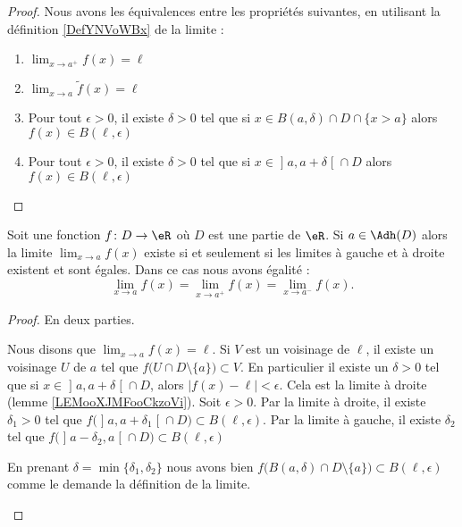 \begin{proof}
	Nous avons les équivalences entre les propriétés suivantes, en utilisant la définition \ref{DefYNVoWBx} de la limite :
	\begin{enumerate}
		\item
		      \( \lim_{x\to a^+} f(x)=\ell\)
		\item
		      \( \lim_{x\to a} \tilde f(x)=\ell\)
		\item
		      Pour tout \( \epsilon>0\), il existe \( \delta>0\) tel que si \( x\in B(a,\delta)\cap D\cap\{ x>a \}\) alors \( f(x)\in B(\ell,\epsilon)\)
		\item
		      Pour tout \( \epsilon>0\), il existe \( \delta>0\) tel que si \( x\in \mathopen] a , a+\delta \mathclose[\cap D\) alors \( f(x)\in B(\ell,\epsilon)\)
	\end{enumerate}
\end{proof}

\begin{proposition}      \label{PROPooGDDJooDCmydE}
	Soit une fonction \( f\colon D\to \eR\) où \( D\) est une partie de \( \eR\). Si \( a\in \Adh(D)\) alors la limite \( \lim_{x\to a} f(x)\) existe si et seulement si les limites à gauche et à droite existent et sont égales. Dans ce cas nous avons égalité :
	\begin{equation}
		\lim_{x\to a} f(x)=\lim_{x\to a^+} f(x)=\lim_{x\to a^-} f(x).
	\end{equation}
\end{proposition}

\begin{proof}
	En deux parties.
	\begin{subproof}
		\spitem[\( \Rightarrow\)]
		Nous disons que \( \lim_{x\to a} f(x)=\ell\). Si \( V\) est un voisinage de \( \ell\), il existe un voisinage \( U\) de \( a\) tel que \( f\big( U\cap D\setminus \{ a \} \big)\subset V\). En particulier il existe un \( \delta>0\) tel que si \( x\in \mathopen] a , a+\delta \mathclose[\cap D\), alors \( | f(x)-\ell |<\epsilon\). Cela est la limite à droite (lemme \ref{LEMooXJMFooCkzoVi}).
		\spitem[\( \Leftarrow\)]
		Soit \( \epsilon>0\). Par la limite à droite, il existe \( \delta_1>0\) tel que \( f\big( \mathopen] a , a+\delta_1 \mathclose[\cap D \big)\subset B(\ell,\epsilon)\). Par la limite à gauche, il existe \( \delta_2\) tel que \( f\big( \mathopen] a-\delta_2 , a \mathclose[\cap D \big)\subset B(\ell,\epsilon)\)

		En prenant \( \delta=\min\{ \delta_1,\delta_2 \}\) nous avons bien \( f\big( B(a,\delta)\cap D\setminus\{ a \} \big)\subset B(\ell,\epsilon)\) comme le demande la définition de la limite.
	\end{subproof}
\end{proof}

